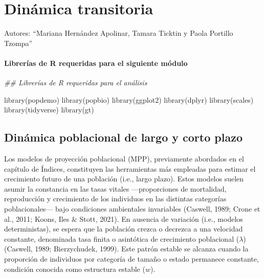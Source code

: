 \documentclass[
  12pt,
  letterpaper,
]{book}
\author{}
\date{}
\newenvironment{Shaded}{\begin{snugshade}}{\end{snugshade}}
\newcommand{\DocumentationTok}[1]{\textcolor[rgb]{0.37,0.37,0.37}{\textit{#1}}}
\newcommand{\FunctionTok}[1]{\textcolor[rgb]{0.28,0.35,0.67}{#1}}
\newcommand{\NormalTok}[1]{\textcolor[rgb]{0.00,0.23,0.31}{#1}}
\renewcommand*\contentsname{Table of contents}
\newcommand\contentsname{Table of contents}
\begin{document}
\frontmatter

\renewcommand*\contentsname{Table of contents}
{
\hypersetup{linkcolor=}
\setcounter{tocdepth}{2}
\tableofcontents
}

\mainmatter
\chapter{Dinámica transitoria}\label{Dinamica_transitoria}

Autores: ``Mariana Hernández Apolinar, Tamara Ticktin y Paola Portillo
Tzompa''

\subsubsection{Librerías de R requeridas para el siguiente
módulo}\label{libreruxedas-de-r-requeridas-para-el-siguiente-muxf3dulo}

\begin{Shaded}
\begin{Highlighting}[]
\DocumentationTok{\#\# Librerías de R requeridas para el análisis}

\FunctionTok{library}\NormalTok{(popdemo)}
\FunctionTok{library}\NormalTok{(popbio)}
\FunctionTok{library}\NormalTok{(ggplot2)}
\FunctionTok{library}\NormalTok{(dplyr)}
\FunctionTok{library}\NormalTok{(scales)}
\FunctionTok{library}\NormalTok{(tidyverse)}
\FunctionTok{library}\NormalTok{(gt)}
\end{Highlighting}
\end{Shaded}

\section{Dinámica poblacional de largo y corto
plazo}\label{dinuxe1mica-poblacional-de-largo-y-corto-plazo}

Los modelos de proyección poblacional (MPP), previamente abordados en el
capítulo de Índices, constituyen las herramientas más empleadas para
estimar el crecimiento futuro de una población (i.e., largo plazo).
Estos modelos suelen asumir la constancia en las tasas vitales
---proporciones de mortalidad, reproducción y crecimiento de los
individuos en las distintas categorías poblacionales--- bajo condiciones
ambientales invariables (Caswell, 1989; Crone et al., 2011; Koons, Iles
\& Stott, 2021). En ausencia de variación (i.e., modelos deterministas),
se espera que la población crezca o decrezca a una velocidad constante,
denominada tasa finita o asintótica de crecimiento poblacional (\(λ\))
(Caswell, 1989; Bierzychudek, 1999). Este patrón estable se alcanza
cuando la proporción de individuos por categoría de tamaño o estado
permanece constante, condición conocida como estructura estable (\(w\)).
\end{document}
